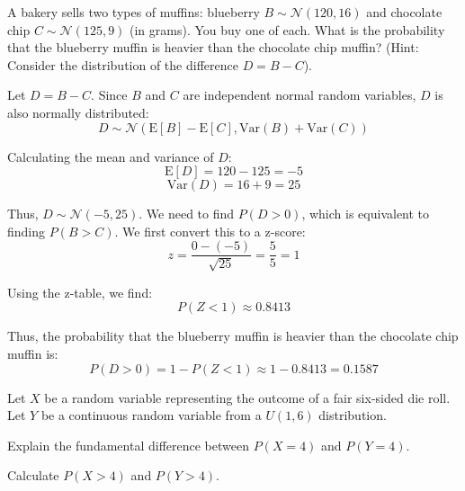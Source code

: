 \documentclass[a4paper, 10pt]{article}
\begin{document}
\begin{problem}
A bakery sells two types of muffins: blueberry \( B \sim \mathcal{N}(120, 16) \) and chocolate chip \( C \sim \mathcal{N}(125, 9) \) (in grams).
You buy one of each. What is the probability that the blueberry muffin is heavier than the chocolate chip muffin?
(Hint: Consider the distribution of the difference \( D = B - C \)).
\end{problem}

\begin{solution}
	Let \( D = B - C \). Since \( B \) and \( C \) are independent normal random variables, \( D \) is also normally distributed:
	\[ D \sim \mathcal{N}(\text{E}[B] - \text{E}[C], \text{Var}(B) + \text{Var}(C)) \]

	Calculating the mean and variance of \( D \):
	\[ \text{E}[D] = 120 - 125 = -5 \]
	\[ \text{Var}(D) = 16 + 9 = 25 \]

	Thus, \( D \sim \mathcal{N}(-5, 25) \).
	We need to find \( P(D > 0) \), which is equivalent to finding \( P(B > C) \).
	We first convert this to a z-score:
	\[ z = \frac{0 - (-5)}{\sqrt{25}} = \frac{5}{5} = 1 \]

	Using the z-table, we find:
	\[ P(Z < 1) \approx 0.8413 \]

	Thus, the probability that the blueberry muffin is heavier than the chocolate chip muffin is:
	\[ P(D > 0) = 1 - P(Z < 1) \approx 1 - 0.8413 = \boxed{0.1587} \]
\end{solution}

\newpage

\begin{problem}
Let \( X \) be a random variable representing the outcome of a fair six-sided die roll.
Let \( Y \) be a continuous random variable from a \( U(1, 6) \) distribution.
\begin{subproblems_alpha}
	\item Explain the fundamental difference between \( P(X = 4) \) and \( P(Y = 4) \).
	\item Calculate \( P(X > 4) \) and \( P(Y > 4) \).
\end{subproblems_alpha}
\end{problem}
\end{document}
